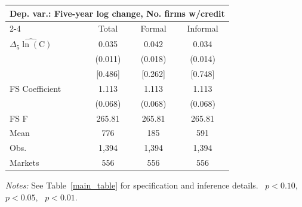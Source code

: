 \begin{threeparttable}
    \begin{tabular}{lccc}
        \toprule
        \multicolumn{4}{c}{\textbf{Dep. var.}: Five-year log change, No. firms w/credit} \\
        \cmidrule(lr){2-4}
        & Total & Formal & Informal \\
        \midrule
        $\widehat{\Delta_5\ln(\text{C})}$
        & 0.035\sym{***} & 0.042\sym{**} & 0.034\sym{**} \\
        & (0.011) & (0.018) & (0.014) \\
        & [0.486] & [0.262] & [0.748] \\
        \midrule
        FS Coefficient & 1.113 & 1.113 & 1.113 \\
                  & (0.068) & (0.068) & (0.068) \\
        FS F & 265.81 & 265.81 & 265.81 \\
        Mean  & 776 & 185 & 591 \\
        Obs. & 1{,}394 & 1{,}394 & 1{,}394 \\
        Markets & 556 & 556 & 556 \\
        \bottomrule
    \end{tabular}
    \begin{tablenotes}[flushleft]
        \footnotesize
        \item \textit{Notes:} See Table~\ref{main_table} for specification and inference details. \sym{*}~$p<0.10$, \sym{**}~$p<0.05$, \sym{***}~$p<0.01$.
    \end{tablenotes}
\end{threeparttable}